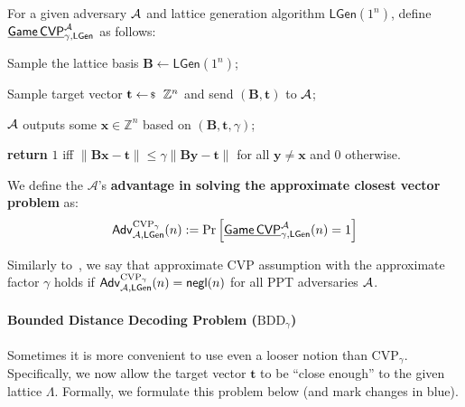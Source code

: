 \documentclass[../../book.tex]{subfiles}
\begin{document}
\begin{definition}\label{def:cvp}
    For a given adversary $\mathcal{A}$ and lattice generation algorithm $\mathsf{LGen}(1^{n})$, define $\underline{\mathsf{Game}\,\mathsf{CVP}}^{\mathcal{A}}_{\gamma,\mathsf{LGen}}$ as follows:
    \begin{algoen}
        \item Sample the lattice basis $\mathbf{B} \gets \mathsf{LGen}(1^{n})$;
        \item Sample target vector $\mathbf{t} \leftarrowS \mathbb{Z}^{n}$ and send $(\mathbf{B},\mathbf{t})$ to $\mathcal{A}$;
        \item $\mathcal{A}$ outputs some $\mathbf{x} \in \mathbb{Z}^{n}$ based on $(\mathbf{B},\mathbf{t},\gamma)$;
        \item \textbf{return} $1$ iff $\|\mathbf{B}\mathbf{x}-\mathbf{t}\| \leq \gamma\|\mathbf{B}\mathbf{y}-\mathbf{t}\|$ for all $\mathbf{y} \neq \mathbf{x}$ and $0$ otherwise.
    \end{algoen}
    We define the $\mathcal{A}$'s \textbf{advantage in solving the approximate closest
    vector problem} as:
    \begin{equation*}
        \mathsf{Adv}^{\text{CVP}_{\gamma}}_{\mathcal{A},\mathsf{LGen}}(n) := \Pr\left[\underline{\mathsf{Game}\,\mathsf{CVP}}^{\mathcal{A}}_{\gamma,\mathsf{LGen}}(n) = 1\right]
    \end{equation*} 
\end{definition}

Similarly to~, we say that approximate CVP assumption with the approximate factor $\gamma$ holds if $\mathsf{Adv}^{\text{CVP}_{\gamma}}_{\mathcal{A},\mathsf{LGen}}(n)=\mathsf{negl}(n)$ for all PPT adversaries $\mathcal{A}$.

\paragraph{Bounded Distance Decoding Problem ($\text{BDD}_{\gamma}$)}\label{section:bdd}

Sometimes it is more convenient to use even a looser notion than $\text{CVP}_{\gamma}$.
Specifically, we now allow the target vector $\mathbf{t}$ to be ``close enough'' to the given lattice $\Lambda$.
Formally, we formulate this problem below (and mark changes in \textcolor{blue!70!purple}{blue}).
\end{document}
